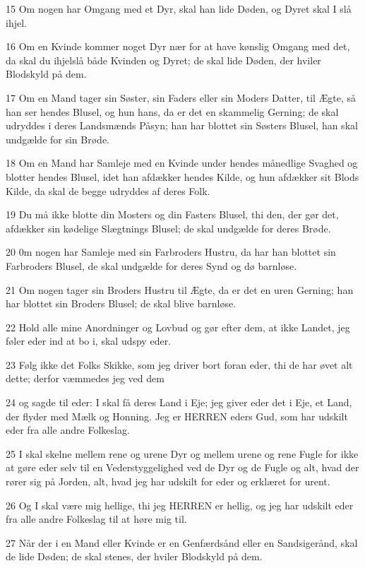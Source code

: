 \par 15 Om nogen har Omgang med et Dyr, skal han lide Døden, og Dyret skal I slå ihjel.
\par 16 Om en Kvinde kommer noget Dyr nær for at have kønslig Omgang med det, da skal du ihjelslå både Kvinden og Dyret; de skal lide Døden, der hviler Blodskyld på dem.
\par 17 Om en Mand tager sin Søster, sin Faders eller sin Moders Datter, til Ægte, så han ser hendes Blusel, og hun hans, da er det en skammelig Gerning; de skal udryddes i deres Landsmænds Påsyn; han har blottet sin Søsters Blusel, han skal undgælde for sin Brøde.
\par 18 Om en Mand har Samleje med en Kvinde under hendes månedlige Svaghed og blotter hendes Blusel, idet han afdækker hendes Kilde, og hun afdækker sit Blods Kilde, da skal de begge udryddes af deres Folk.
\par 19 Du må ikke blotte din Mosters og din Fasters Blusel, thi den, der gør det, afdækker sin kødelige Slægtnings Blusel; de skal undgælde for deres Brøde.
\par 20 0m nogen har Samleje med sin Farbroders Hustru, da har han blottet sin Farbroders Blusel, de skal undgælde for deres Synd og dø barnløse.
\par 21 Om nogen tager sin Broders Hustru til Ægte, da er det en uren Gerning; han har blottet sin Broders Blusel; de skal blive barnløse.
\par 22 Hold alle mine Anordninger og Lovbud og gør efter dem, at ikke Landet, jeg føler eder ind at bo i, skal udspy eder.
\par 23 Følg ikke det Folks Skikke, som jeg driver bort foran eder, thi de har øvet alt dette; derfor væmmedes jeg ved dem
\par 24 og sagde til eder: I skal få deres Land i Eje; jeg giver eder det i Eje, et Land, der flyder med Mælk og Honning. Jeg er HERREN eders Gud, som har udskilt eder fra alle andre Folkeslag.
\par 25 I skal skelne mellem rene og urene Dyr og mellem urene og rene Fugle for ikke at gøre eder selv til en Vederstyggelighed ved de Dyr og de Fugle og alt, hvad der rører sig på Jorden, alt, hvad jeg har udskilt for eder og erklæret for urent.
\par 26 Og I skal være mig hellige, thi jeg HERREN er hellig, og jeg har udskilt eder fra alle andre Folkeslag til at høre mig til.
\par 27 Når der i en Mand eller Kvinde er en Genfærdsånd eller en Sandsigerånd, skal de lide Døden; de skal stenes, der hviler Blodskyld på dem.

